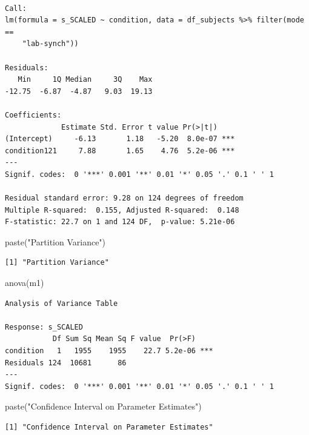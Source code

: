 \documentclass[
  letterpaper,
  DIV=11,
  numbers=noendperiod]{scrreprt}
\newenvironment{Shaded}{\begin{snugshade}}{\end{snugshade}}
\newcommand{\FunctionTok}[1]{\textcolor[rgb]{0.28,0.35,0.67}{#1}}
\newcommand{\NormalTok}[1]{\textcolor[rgb]{0.00,0.23,0.31}{#1}}
\newcommand{\StringTok}[1]{\textcolor[rgb]{0.13,0.47,0.30}{#1}}
\begin{document}
\begin{verbatim}

Call:
lm(formula = s_SCALED ~ condition, data = df_subjects %>% filter(mode == 
    "lab-synch"))

Residuals:
   Min     1Q Median     3Q    Max 
-12.75  -6.87  -4.87   9.03  19.13 

Coefficients:
             Estimate Std. Error t value Pr(>|t|)    
(Intercept)     -6.13       1.18   -5.20  8.0e-07 ***
condition121     7.88       1.65    4.76  5.2e-06 ***
---
Signif. codes:  0 '***' 0.001 '**' 0.01 '*' 0.05 '.' 0.1 ' ' 1

Residual standard error: 9.28 on 124 degrees of freedom
Multiple R-squared:  0.155, Adjusted R-squared:  0.148 
F-statistic: 22.7 on 1 and 124 DF,  p-value: 5.21e-06
\end{verbatim}

\begin{Shaded}
\begin{Highlighting}[]
\FunctionTok{paste}\NormalTok{(}\StringTok{"Partition Variance"}\NormalTok{)}
\end{Highlighting}
\end{Shaded}

\begin{verbatim}
[1] "Partition Variance"
\end{verbatim}

\begin{Shaded}
\begin{Highlighting}[]
\FunctionTok{anova}\NormalTok{(m1)}
\end{Highlighting}
\end{Shaded}

\begin{verbatim}
Analysis of Variance Table

Response: s_SCALED
           Df Sum Sq Mean Sq F value  Pr(>F)    
condition   1   1955    1955    22.7 5.2e-06 ***
Residuals 124  10681      86                    
---
Signif. codes:  0 '***' 0.001 '**' 0.01 '*' 0.05 '.' 0.1 ' ' 1
\end{verbatim}

\begin{Shaded}
\begin{Highlighting}[]
\FunctionTok{paste}\NormalTok{(}\StringTok{"Confidence Interval on Parameter Estimates"}\NormalTok{)}
\end{Highlighting}
\end{Shaded}

\begin{verbatim}
[1] "Confidence Interval on Parameter Estimates"
\end{verbatim}
\end{document}
